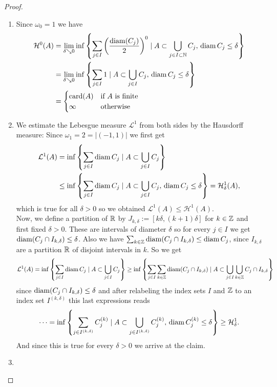 \begin{proof}~
\begin{enumerate}[(1)]
\item Since $\omega_0 = 1$ we have 
\[
\begin{aligned}
\mathcal{H}^0(A) &= \lim_{\delta \searrow 0} \inf \left\{ \sum_{j\in I}
\left(\frac{\operatorname{diam}(C_j)}{2}\right)^0 \mid A \subset \bigcup_{j\in I \subset \mathbb{N}}
C_j, \,
\operatorname{diam} C_j \leq \delta  \right\} 
\\& =
\lim_{\delta \searrow 0} \inf \left\{ \sum_{j\in I}
1 \mid A \subset \bigcup_{j\in I} C_j,\,
\operatorname{diam} C_j \leq \delta  \right\} 
\\&=
\begin{cases}
\text{card}(A) & \text{if $A$ is finite}
\\
\infty & \text{otherwise}
\end{cases}
\end{aligned}
\]
\item We estimate the Lebesgue measure $\mathcal{L}^1$ from both sides by the
Hausdorff measure: Since $\omega_1 = 2 = |(-1,1)|$ we first get 
\[
\begin{aligned}
\mathcal{L}^1(A) 
&= \inf \left\{ \sum_{j\in I} \operatorname{diam} C_j \mid A \subset \bigcup_{j\in I} C_j \right\}
\\ & \leq 
\inf \left\{ \sum_{j\in I} \operatorname{diam} C_j \mid A \subset \bigcup_{j\in I} C_j, \,
\operatorname{diam} C_j \leq \delta \right\}
= 
\mathcal{H}^1_\delta(A),
\end{aligned}
\]
which is true for all $\delta > 0$ so we obtained $\mathcal{L}^1(A) \leq
\mathcal{H}^1(A)$.
\\
Now, we define a partition of $\mathbb{R}$ by $J_{k,\delta} := [k\delta, (k+1)\delta]$
for $k \in \mathbb{Z}$ and first fixed $\delta >0$. These are intervals of diameter
$\delta$ so for every $j \in I$ we get $\operatorname{diam}(C_j \cap I_{k,\delta}) \leq
\delta$. Also we have $\sum_{k\in\mathbb{Z}} \operatorname{diam}(C_j \cap I_{k,\delta}) \leq \operatorname{diam} C_j$,
since $I_{k,\delta}$ are a partition $\mathbb{R}$ of disjoint intervals in $k$. So we
get
\[
\begin{aligned}
\mathcal{L}^1(A) = \inf \left\{ \sum_{j\in I} \operatorname{diam} C_j \mid A \subset
\bigcup_{j\in I} C_j \right\}
\geq \inf \left\{ \sum_{j\in I} \sum_{k\in\mathbb{Z}} \operatorname{diam} (C_j \cap I_{k,\delta}) \mid A \subset
\bigcup_{j\in I} \bigcup_{k\in\mathbb{Z}} C_j\cap I_{k,\delta} \right\}
\end{aligned}
\]
since $\operatorname{diam} (C_j \cap I_{k,\delta} ) \leq \delta$ and after relabeling the
index sets $I$ and $\mathbb{Z}$ to an index set $I^{(k,\delta)}$ this last expressions reads 
\[
\dots = \inf \left\{ \sum_{j \in I^{(k,\delta)}} C_j^{(k)} \mid A \subset \bigcup_{j \in
I^{(k,\delta)}} C_j^{(k)},\, \operatorname{diam} C_j^{(k)} \leq \delta \right\} \geq \mathcal{H}^1_\delta.
\]
And since this is true for every $\delta >0$ we arrive at the claim.
\item \TODO
\end{enumerate}
\end{proof}
